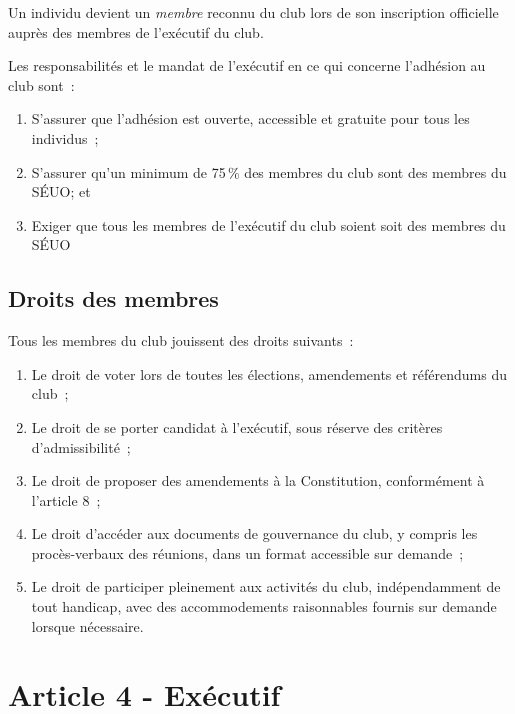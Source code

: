 
Un individu devient un \emph{membre} reconnu du club lors de son inscription officielle auprès des membres de l'exécutif du club.

Les responsabilités et le mandat de l'exécutif en ce qui concerne l'adhésion au
club sont~:
\begin{enumerate}
    \item S'assurer que l'adhésion est ouverte, accessible et gratuite pour tous les individus~;
    \item S'assurer qu'un minimum de 75\,\% des membres du club sont des membres du SÉUO; et
    \item Exiger que tous les membres de l'exécutif du club soient soit des membres du SÉUO
\end{enumerate}
\subsection*{Droits des membres}
Tous les membres du club jouissent des droits suivants~:
\begin{enumerate}
    \item Le droit de voter lors de toutes les élections, amendements et référendums du club~;
    \item Le droit de se porter candidat à l'exécutif, sous réserve des critères d'admissibilité~;
    \item Le droit de proposer des amendements à la Constitution, conformément à l'article 8~;
    \item Le droit d'accéder aux documents de gouvernance du club, y compris les procès-verbaux des réunions, dans un format accessible sur demande~;
    \item Le droit de participer pleinement aux activités du club, indépendamment de tout handicap, avec des accommodements raisonnables fournis sur demande lorsque nécessaire.
\end{enumerate}

\section*{Article 4 - Exécutif}

